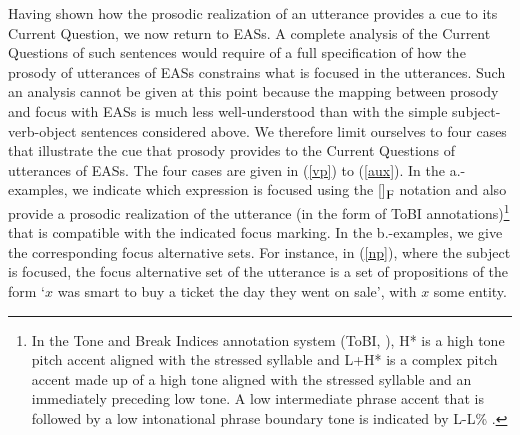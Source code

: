 \documentclass[11pt,fleqn]{article}
\newcommand{\foc}{$_{\mbox{\small F}}$}
\newcommand{\6}{\mbox{$[\hspace*{-.6mm}[$}}
\newcommand{\9}{\mbox{$]\hspace*{-.6mm}]$}}
\begin{document}
Having shown how the prosodic realization of an utterance provides a cue to its  Current Question, we now return to EASs. A complete analysis of the Current Questions of such sentences would require of a full specification of how the prosody of utterances of EASs constrains what is focused in the utterances. Such an analysis cannot be given at this point because  the mapping between prosody and focus with EASs is much less well-understood than with the simple subject-verb-object sentences considered above. We therefore limit ourselves to four cases that illustrate the cue that prosody provides to the Current Questions of utterances of EASs. The four cases are given in (\ref{vp}) to (\ref{aux}). In the a.-examples, we indicate which expression is focused using the [\hspace*{.1cm}]\foc{} notation and also provide a prosodic realization of the utterance (in the form of  ToBI annotations)\footnote{In the Tone and Break Indices annotation system (ToBI,
\citealt{beckman-ayers97}), H* is a
high tone pitch accent aligned with the stressed syllable and L+H*  is a
complex pitch accent made up of a high tone aligned with the stressed
syllable and an immediately preceding low tone. A low intermediate phrase accent
that is followed by a low intonational phrase boundary tone is indicated
by L-L\% .} that is compatible with the indicated focus marking. In the b.-examples, we give the corresponding focus alternative sets. For instance, in (\ref{np}), where the subject is focused, the focus alternative set of the utterance is a set of propositions of the form `$x$ was smart to buy a ticket the day they went on sale', with $x$ some entity.
\end{document}
